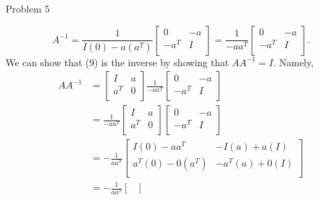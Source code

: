 \begin{problem}{Problem 5}
\begin{Highlight}
        \begin{equation}
            A^{-1} = \frac{1}{I(0) - a(a^{T})} 
            \begin{bmatrix}
                0 & -a \\
                -a^{T} & I \\
            \end{bmatrix}
            = \frac{1}{-aa^{T}}
            \begin{bmatrix}
                0 & -a \\
                -a^{T} & I \\
            \end{bmatrix}.
        \end{equation}
        We can show that (9) is the inverse by showing that $AA^{-1} = I$. Namely,
        \begin{align}
            AA^{-1} & = 
            \begin{bmatrix}
                I & a \\
                a^{T} & 0 \\
            \end{bmatrix}
            \frac{1}{-aa^{T}}
            \begin{bmatrix}
                0 & -a \\
                -a^{T} & I \\
            \end{bmatrix} \\
            & = \frac{1}{-aa^{T}}
            \begin{bmatrix}
                I & a \\
                a^{T} & 0 \\
            \end{bmatrix}
            \begin{bmatrix}
                0 & -a \\
                -a^{T} & I \\
            \end{bmatrix} \\
            & = -\frac{1}{aa^{T}}
            \begin{bmatrix}
                I(0) - aa^{T} & -I(a) + a(I) \\
                a^{T}(0) - 0(a^{T}) & -a^{T}(a) + 0(I) \\
            \end{bmatrix} \\
            & = -\frac{1}{aa^{T}}
            \begin{bmatrix}

\end{bmatrix}
\end{align}
\end{Highlight}
\end{problem}
